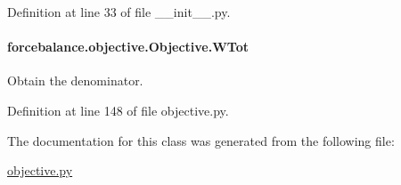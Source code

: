 Definition at line 33 of file \-\_\-\-\_\-init\-\_\-\-\_\-.\-py.

\hypertarget{classforcebalance_1_1objective_1_1Objective_a1ea300bb1db142dfdf43621454e8c589}{
\paragraph[{W\-Tot}]{\setlength{\rightskip}{0pt plus 5cm}forcebalance.\-objective.\-Objective.\-W\-Tot}}\label{classforcebalance_1_1objective_1_1Objective_a1ea300bb1db142dfdf43621454e8c589}


Obtain the denominator. 



Definition at line 148 of file objective.\-py.



The documentation for this class was generated from the following file\-:\begin{DoxyCompactItemize}
\item 
\hyperlink{objective_8py}{objective.\-py}\end{DoxyCompactItemize}
